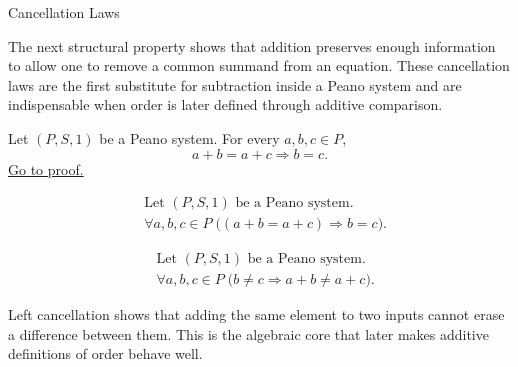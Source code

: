 \begin{topicbox}{Cancellation Laws}
\begin{exposition}
The next structural property shows that addition preserves enough information
to allow one to remove a common summand from an equation. These cancellation
laws are the first substitute for subtraction inside a Peano system and are
indispensable when order is later defined through additive comparison.
\end{exposition}

\begin{tcolorbox}[colback=thmbox, colframe=thmborder, arc=2pt,
  left=6pt, right=6pt, top=4pt, bottom=4pt,
  title={\small\textbf{Theorem (Left Cancellation for Addition)}},
  fonttitle=\small\bfseries]
\begin{theorem}
\label{thm:addition-left-cancellation}
Let $(P,S,1)$ be a Peano system. For every $a,b,c \in P$,
\[
a+b=a+c
\Longrightarrow
b=c.
\]
\hyperref[prf:addition-left-cancellation]{Go to proof.}
\end{theorem}
\end{tcolorbox}

\begin{remark*}
\[
\begin{aligned}
&\text{Let } (P,S,1) \text{ be a Peano system.}\\
&\forall a,b,c \in P\;\bigl((a+b=a+c) \Longrightarrow b=c\bigr).
\end{aligned}
\]
\end{remark*}

\begin{remark*}
\[
\begin{aligned}
&\text{Let } (P,S,1) \text{ be a Peano system.}\\
&\forall a,b,c \in P\;\bigl(b \neq c \Longrightarrow a+b \neq a+c\bigr).
\end{aligned}
\]
\end{remark*}

\begin{remark*}[Interpretation]
Left cancellation shows that adding the same element to two inputs cannot
erase a difference between them. This is the algebraic core that later makes
additive definitions of order behave well.
\end{remark*}


\end{topicbox}
